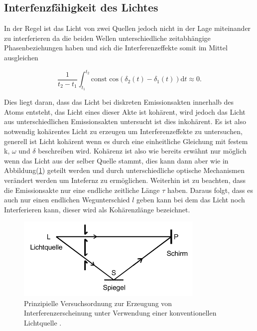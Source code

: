     \subsection{Interfenzfähigkeit des Lichtes}

        \noindent In der Regel ist das Licht von zwei Quellen jedoch nicht in der Lage miteinander zu interferieren da die beiden Wellen 
        unterschiedliche zeitabhängige Phasenbeziehungen haben und sich die Interferenzeffekte somit im Mittel ausgleichen

        \begin{equation}
            \frac{1}{t_2 - t_1} \int_{t_1}^{t_2} \text{const cos}(\delta_2(t)-\delta_1(t)) \text{d}t \approx 0 . \nonumber
        \end{equation}
        
        \noindent Dies liegt daran, dass das Licht bei diskreten Emissionsakten innerhalb des Atoms entsteht, das Licht eines dieser Akte 
        ist kohärent, wird jedoch das Licht aus unterschiedlichen Emissionsakten untersucht ist dies inkohärent.
        Es ist also notwendig kohärentes Licht zu erzeugen um Interferenzeffekte zu untersuchen, generell ist Licht kohärent wenn es durch 
        eine einheitliche Gleichung mit festem k, $\omega$ und $\delta$ beschreiben wird. Kohärenz ist also wie bereits erwähnt nur möglich wenn 
        das Licht aus der selber Quelle stammt, dies kann dann aber wie in Abbildung(\ref{img:konv}) geteilt werden und durch unterschiedliche optische 
        Mechanismen verändert werden um Intefernz zu ermöglichen. Weiterhin ist zu beachten, dass die Emissionsakte nur eine endliche 
        zeitliche Länge $\tau$ haben. Daraus folgt, dass es auch nur einen endlichen Wegunterschied $l$ geben kann bei dem das Licht noch 
        Interferieren kann, dieser wird als Kohärenzlänge bezeichnet.
        
        \begin{figure}[ht]
            \centering
            \includegraphics[width=0.8\textwidth]{latex/images/konvenL.PNG}
            \caption{Prinzipielle Versuchsordnung zur Erzeugung von Interferenzerscheinung unter Verwendung einer konventionellen 
            Lichtquelle \protect \cite{V401}.}
            \label{img:konv}
        \end{figure}

